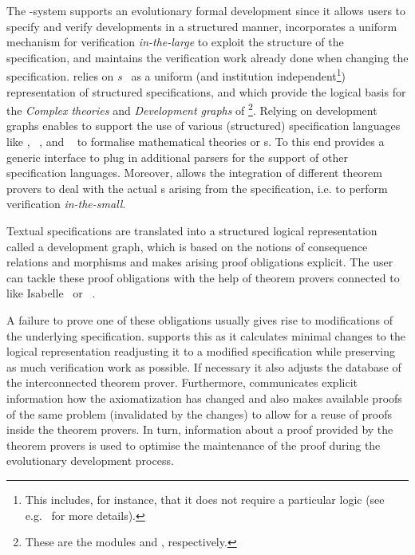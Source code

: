 The {\maya}-system supports an evolutionary formal development since it allows users to
specify and verify developments in a structured manner, incorporates a uniform mechanism
for verification {\emph{in-the-large}} to exploit the
structure of the specification, and maintains the verification work already done when
changing the specification. {\maya} relies on
{\emph{s}}~\cite{AH-05-a,Hutter:mocsv00} as a uniform (and
institution independent\footnote{This includes, for instance, that it does not require a
  particular logic (see e.g.~\cite{MAH-06-a} for more details).})  representation of
structured specifications, and which provide the logical basis for the {\emph{Complex
    theories}} and {\emph{Development graphs}} of {\omdoc}\footnote{These are the modules
  {} and {}, respectively.}.  Relying on development graphs
enables {\maya} to support the use of various (structured) specification languages like
{\omdoc}, {\casl}~\cite{CoFI:2004:CASL-RM}, and {\vsesl}~\cite{VSE00} to formalise
mathematical theories or
{s}.  To this end {\maya} provides a generic
interface to plug in additional parsers for the support of other specification languages.
Moreover, {\maya} allows the integration of different theorem provers to deal with the
actual {s} arising from the specification, i.e.  to perform
verification {\emph{in-the-small}}.

Textual specifications are translated into a structured logical representation called a
development graph, which is based on the notions of consequence relations and morphisms
and makes arising proof obligations explicit.  The user can tackle these proof obligations
with the help of theorem provers connected to {\maya} like Isabelle~\cite{Paulson:iagtp94}
or {\inka}~\cite{INKA5}.

A failure to prove one of these obligations usually gives rise to modifications of the
underlying specification.  {\maya} supports this {} as it
calculates minimal changes to the logical representation readjusting it to a modified
specification while preserving as much verification work as possible.  If necessary it
also adjusts the database of the interconnected theorem prover.  Furthermore, {\maya}
communicates explicit information how the axiomatization has changed and also makes
available proofs of the same problem (invalidated by the changes) to allow for a reuse of
proofs inside the theorem provers. In turn, information about a proof provided by the
theorem provers is used to optimise the maintenance of the proof during the evolutionary
development process.

